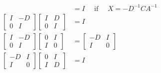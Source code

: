 \documentclass[main.tex]{subfiles}
\begin{document}
\begin{enumerate}
$$\begin{aligned}
    & = I \quad \text{ if } \quad X=-D^{-1} C A^{-1}\\
    \left[\begin{array}{cc}
    I & -D \\
    0 & I
    \end{array}\right]\left[\begin{array}{ll}
    I & D \\
    0 & I
    \end{array}\right]&=I\\
    \left[\begin{array}{cc}
    I & -D \\
    0 & I
    \end{array}\right]\left[\begin{array}{ll}
    0 & I \\
    I & 0
    \end{array}\right]&=\left[\begin{array}{cc}
    -D & I \\
    I & 0
    \end{array}\right]\\
    \left[\begin{array}{cc}
    -D & I \\
    I & 0
    \end{array}\right]
    \left[\begin{array}{ll}
    0 & I \\
    I & D
    \end{array}\right] 
    & = I
    \end{aligned}
    $$

\end{enumerate}
\end{document}
